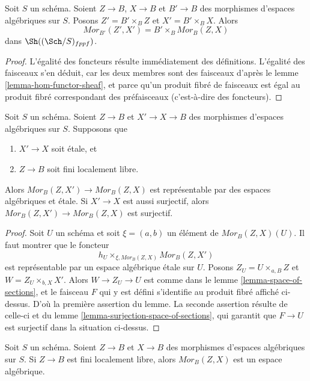 \begin{lemma}
\label{lemma-base-change-hom-functor}
Soit $S$ un schéma. Soient $Z \to B$, $X \to B$ et $B' \to B$
des morphismes d'espaces algébriques sur $S$. Posons $Z' = B' \times_B Z$
et $X' = B' \times_B X$. Alors
$$
\mathit{Mor}_{B'}(Z', X')
=
B' \times_B \mathit{Mor}_B(Z, X)
$$
dans $\Sh((\Sch/S)_{fppf})$.
\end{lemma}

\begin{proof}
L'égalité des foncteurs résulte immédiatement des définitions.
L'égalité des faisceaux s'en déduit, car les deux membres sont des
faisceaux d'après le
lemme \ref{lemma-hom-functor-sheaf},
et parce qu'un produit fibré de faisceaux est égal au
produit fibré correspondant des préfaisceaux (c'est-à-dire des foncteurs).
\end{proof}

\begin{lemma}
\label{lemma-etale-covering-hom-functor}
Soit $S$ un schéma. Soient $Z \to B$ et $X' \to X \to B$ des morphismes
d'espaces algébriques sur $S$. Supposons que
\begin{enumerate}
\item $X' \to X$ soit étale, et
\item $Z \to B$ soit fini localement libre.
\end{enumerate}
Alors $\mathit{Mor}_B(Z, X') \to \mathit{Mor}_B(Z, X)$ est représentable
par des espaces algébriques et étale. Si $X' \to X$ est aussi surjectif,
alors $\mathit{Mor}_B(Z, X') \to \mathit{Mor}_B(Z, X)$ est surjectif.
\end{lemma}

\begin{proof}
Soit $U$ un schéma et soit $\xi = (a, b)$ un élément de
$\mathit{Mor}_B(Z, X)(U)$. Il faut montrer que le foncteur
$$
h_U \times_{\xi, \mathit{Mor}_B(Z, X)} \mathit{Mor}_B(Z, X')
$$
est représentable par un espace algébrique étale sur $U$. Posons
$Z_U = U \times_{a, B} Z$ et $W = Z_U \times_{b, X} X'$.
Alors $W \to Z_U \to U$ est comme dans le
lemme \ref{lemma-space-of-sections},
et le faisceau $F$ qui y est défini s'identifie au produit fibré
affiché ci-dessus. D'où la première assertion du lemme.
La seconde assertion résulte de celle-ci et du
lemme \ref{lemma-surjection-space-of-sections},
qui garantit que $F \to U$ est surjectif dans la situation ci-dessus.
\end{proof}

\begin{proposition}
\label{proposition-hom-functor-algebraic-space}
Soit $S$ un schéma. Soient $Z \to B$ et $X \to B$ des morphismes
d'espaces algébriques sur $S$. Si $Z \to B$ est fini localement libre,
alors $\mathit{Mor}_B(Z, X)$ est un espace algébrique.
\end{proposition}

